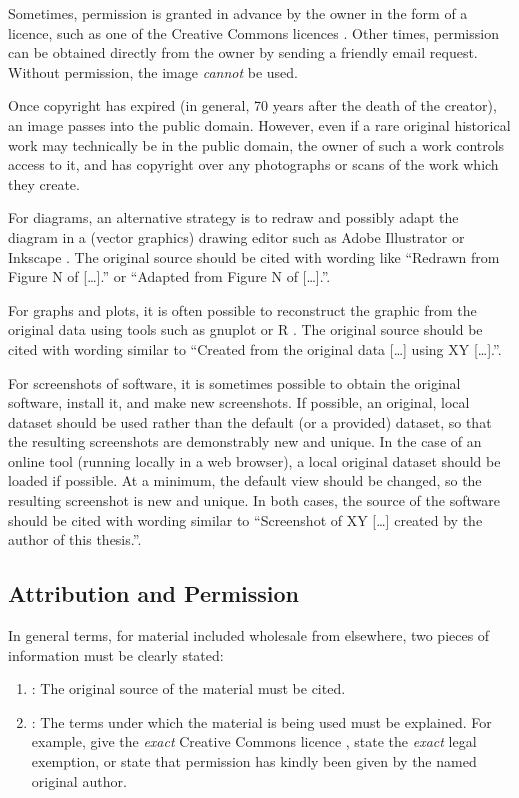 Sometimes, permission is granted in advance by the owner in the form
of a licence, such as one of the Creative Commons licences
\parencite{CC-Licences}. Other times, permission can be obtained
directly from the owner by sending a friendly email request. Without
permission, the image \emph{cannot} be used.

Once copyright has expired (in general, 70 years after the death of
the creator), an image passes into the public domain. However, even if
a rare original historical work may technically be in the public
domain, the owner of such a work controls access to it, and has
copyright over any photographs or scans of the work which they create.


For diagrams, an alternative strategy is to redraw and possibly adapt
the diagram in a (vector graphics) drawing editor such as Adobe
Illustrator \parencite{Adobe-Illustrator} or Inkscape
\parencite{Inkscape}. The original source should be cited with wording
like ``Redrawn from Figure N of [\ldots].'' or ``Adapted from Figure N
of [\ldots].''.

For graphs and plots, it is often possible to reconstruct the graphic
from the original data using tools such as gnuplot \parencite{gnuplot}
or R \parencite{R-Project}. The original source should be cited with
wording similar to ``Created from the original data [\ldots] using XY
[\ldots].''.


For screenshots of software, it is sometimes possible to obtain the
original software, install it, and make new screenshots. If possible,
an original, local dataset should be used rather than the default (or
a provided) dataset, so that the resulting screenshots are
demonstrably new and unique.
%
In the case of an online tool (running locally in a web browser), a
local original dataset should be loaded if possible. At a minimum, the
default view should be changed, so the resulting screenshot is new and
unique.
%
In both cases, the source of the software should be cited with wording
similar to ``Screenshot of XY [\ldots] created by the author of this
thesis.''.







\subsection{Attribution and Permission}

In general terms, for material included wholesale from elsewhere, two
pieces of information must be clearly stated:
\begin{enumerate}
\item {}: The original source of the material must
  be cited.

\item {}: The terms under which the material is
  being used must be explained. For example, give the \emph{exact}
  Creative Commons licence \parencite{CC-Licences}, state the
  \emph{exact} legal exemption, or state that permission has kindly
  been given by the named original author.
\end{enumerate}

